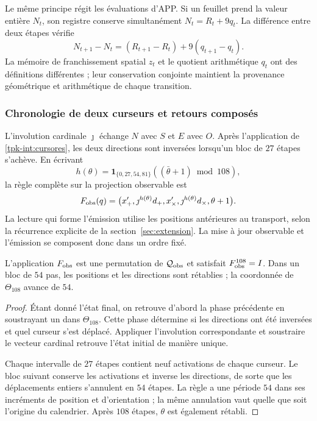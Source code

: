 Le même principe régit les évaluations d'APP. Si un feuillet prend la
valeur entière \(N_t\), son registre conserve simultanément
\(N_t=R_t+9q_t\). La différence entre deux étapes vérifie
\[
 N_{t+1}-N_t=(R_{t+1}-R_t)+9(q_{t+1}-q_t).
\]
La mémoire de franchissement spatial \(z_t\) et le quotient arithmétique \(q_t\) ont des définitions différentes ; leur conservation conjointe maintient la provenance géométrique et arithmétique de chaque transition.

\subsubsection{Chronologie de deux curseurs et retours composés}
\label{tpk-int:cronologia}

L'involution cardinale \(\jmath\) échange \(N\) avec \(S\) et
\(E\) avec \(O\). Après l'application de \eqref{tpk-int:cursores}, les deux
directions sont inversées lorsqu'un bloc de \(27\) étapes s'achève.
En écrivant
\[
 h(\theta)=\mathbf1_{\{0,27,54,81\}}
             ((\bar\theta+1)\bmod108),
\]
la règle complète sur la projection observable est
\begin{equation}
 F_{\rm obs}(q)=
 \bigl(x_+',\jmath^{h(\theta)}d_+,
       x_\times',\jmath^{h(\theta)}d_\times,
       \theta+1\bigr).
 \label{tpk-int:fobs}
\end{equation}
La lecture qui forme l'émission utilise les positions antérieures au
transport, selon la récurrence explicite de la
section~\ref{sec:extension}. La mise à jour observable et l'émission
se composent donc dans un ordre fixé.

\begin{proposition}
\label{tpk-int:periodo}
L'application \(F_{\rm obs}\) est une permutation de \(\mathcal Q_{\rm obs}\) et satisfait \(F_{\rm obs}^{108}=I\). Dans un bloc de \(54\) pas, les positions et les directions sont rétablies ; la coordonnée de \(\Theta_{108}\) avance de \(54\).
\end{proposition}
\begin{proof}
Étant donné l'état final, on retrouve d'abord la phase précédente en soustrayant un
dans \(\Theta_{108}\). Cette phase détermine si les
directions ont été inversées et quel curseur s'est déplacé. Appliquer l'involution correspondante
et soustraire le vecteur cardinal retrouve l'état initial de manière unique.

Chaque intervalle de \(27\) étapes contient neuf activations de chaque
curseur. Le bloc suivant conserve les activations et inverse les
directions, de sorte que les déplacements entiers s'annulent en
\(54\) étapes. La règle a une période \(54\) dans ses incréments de
position et d'orientation ; la même annulation vaut quelle que soit l'origine
du calendrier. Après \(108\) étapes, \(\theta\) est également rétabli.
\end{proof}

